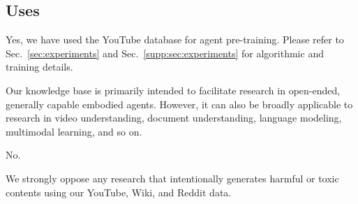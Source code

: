 \subsection{Uses}
 Yes, we have used the \minedojo YouTube database for agent pre-training. Please refer to Sec.~\ref{sec:experiments} and Sec.~\ref{supp:sec:experiments} for algorithmic and training details.

 Our knowledge base is primarily intended to facilitate research in open-ended, generally capable embodied agents. However, it can also be broadly applicable to research in video understanding, document understanding, language modeling, multimodal learning, and so on. 

  No.

  We strongly oppose any research that intentionally generates harmful or toxic contents using our YouTube, Wiki, and Reddit data. 
